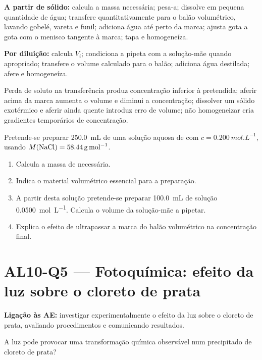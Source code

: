 \documentclass[11pt,a4paper,openany]{book}
\newcounter{exercicio}[chapter]
\renewcommand{\theexercicio}{\thechapter.\arabic{exercicio}}
\newenvironment{exercicio}[1][]%
{\refstepcounter{exercicio}%
\begin{tcolorbox}[breakable,colback=white,colframe=eublue!70,
 title={Exercício \theexercicio\if\relax\detokenize{#1}\relax\else\ --- #1\fi},fonttitle=\bfseries]}%
{\end{tcolorbox}}
\newcommand{\LigAE}[1]{\textbf{Ligação às AE:} #1}
\begin{document}
\begin{metodo}
\textbf{A partir de sólido:} calcula a massa necessária; pesa-a; dissolve em pequena quantidade de água; transfere quantitativamente para o balão volumétrico, lavando gobelé, vareta e funil; adiciona água até perto da marca; ajusta gota a gota com o menisco tangente à marca; tapa e homogeneíza.

\smallskip
\textbf{Por diluição:} calcula $V_i$; condiciona a pipeta com a solução-mãe quando apropriado; transfere o volume calculado para o balão; adiciona água destilada; afere e homogeneíza.
\end{metodo}

\begin{erros}
Perda de soluto na transferência produz concentração inferior à pretendida; aferir acima da marca aumenta o volume e diminui a concentração; dissolver um sólido exotérmico e aferir ainda quente introduz erro de volume; não homogeneizar cria gradientes temporários de concentração.
\end{erros}

\begin{exercicio}[Preparar e diluir]
Pretende-se preparar \SI{250.0}{mL} de uma solução aquosa de  com $c=\SI{0.200}{mol.L^{-1}}$, usando $M(\ce{NaCl})=\SI{58.44}{g.mol^{-1}}$.
\begin{enumerate}[label=\alph*)]
\item Calcula a massa de  necessária.
\item Indica o material volumétrico essencial para a preparação.
\item A partir desta solução pretende-se preparar \SI{100.0}{mL} de solução \SI{0.0500}{mol.L^{-1}}. Calcula o volume da solução-mãe a pipetar.
\item Explica o efeito de ultrapassar a marca do balão volumétrico na concentração final.
\end{enumerate}
\end{exercicio}

\section{AL10-Q5 — Fotoquímica: efeito da luz sobre o cloreto de prata}
\LigAE{investigar experimentalmente o efeito da luz sobre o cloreto de prata, avaliando procedimentos e comunicando resultados.}

\begin{questao}
A luz pode provocar uma transformação química observável num precipitado de cloreto de prata?
\end{questao}
\end{document}
